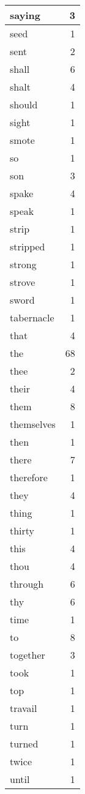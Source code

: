 \begin{center}
\begin{longtable}{l|r}
saying & 3 \\ \hline
seed & 1 \\ \hline
sent & 2 \\ \hline
shall & 6 \\ \hline
shalt & 4 \\ \hline
should & 1 \\ \hline
sight & 1 \\ \hline
smote & 1 \\ \hline
so & 1 \\ \hline
son & 3 \\ \hline
spake & 4 \\ \hline
speak & 1 \\ \hline
strip & 1 \\ \hline
stripped & 1 \\ \hline
strong & 1 \\ \hline
strove & 1 \\ \hline
sword & 1 \\ \hline
tabernacle & 1 \\ \hline
that & 4 \\ \hline
the & 68 \\ \hline
thee & 2 \\ \hline
their & 4 \\ \hline
them & 8 \\ \hline
themselves & 1 \\ \hline
then & 1 \\ \hline
there & 7 \\ \hline
therefore & 1 \\ \hline
they & 4 \\ \hline
thing & 1 \\ \hline
thirty & 1 \\ \hline
this & 4 \\ \hline
thou & 4 \\ \hline
through & 6 \\ \hline
thy & 6 \\ \hline
time & 1 \\ \hline
to & 8 \\ \hline
together & 3 \\ \hline
took & 1 \\ \hline
top & 1 \\ \hline
travail & 1 \\ \hline
turn & 1 \\ \hline
turned & 1 \\ \hline
twice & 1 \\ \hline
until & 1 \\ \hline

\end{longtable}
\end{center}
